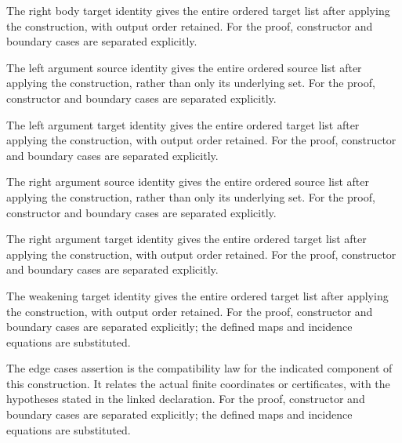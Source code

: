 The right body target identity gives the entire ordered target list after applying the construction, with output order retained.
For the proof, constructor and boundary cases are separated explicitly.
\par{}

The left argument source identity gives the entire ordered source list after applying the construction, rather than only its underlying set.
For the proof, constructor and boundary cases are separated explicitly.
\par{}

The left argument target identity gives the entire ordered target list after applying the construction, with output order retained.
For the proof, constructor and boundary cases are separated explicitly.
\par{}

The right argument source identity gives the entire ordered source list after applying the construction, rather than only its underlying set.
For the proof, constructor and boundary cases are separated explicitly.
\par{}

The right argument target identity gives the entire ordered target list after applying the construction, with output order retained.
For the proof, constructor and boundary cases are separated explicitly.
\par{}

The weakening target identity gives the entire ordered target list after applying the construction, with output order retained.
For the proof, constructor and boundary cases are separated explicitly; the defined maps and incidence equations are substituted.
\par{}

The edge cases assertion is the compatibility law for the indicated component of this construction. It relates the actual finite coordinates or certificates, with the hypotheses stated in the linked declaration.
For the proof, constructor and boundary cases are separated explicitly; the defined maps and incidence equations are substituted.
\par{}

